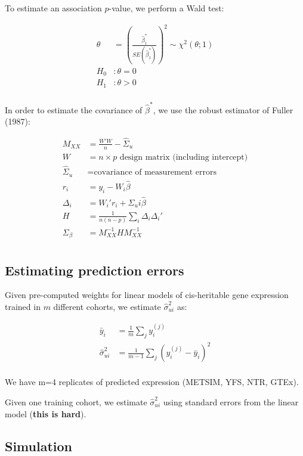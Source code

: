 \documentclass{article}
\begin{document}
To estimate an association \(p\)-value, we perform a Wald test:

\begin{align*}
  \theta &= \left(\frac{\hat\beta_1^*}{SE(\hat\beta_1^*)}\right)^2 \sim \chi^2(\theta; 1)\\
  H_0&: \theta = 0\\
  H_1&: \theta > 0\\
\end{align*}

In order to estimate the covariance of \(\hat\beta^*\), we use the robust
estimator of Fuller (1987):

\begin{align*}
  M_{XX} &= \frac{W' W}{n} - \hat\Sigma_u\\
  W &= \text{$n \times p$ design matrix (including intercept)}\\
  \hat\Sigma_u &= \text{covariance of measurement errors}\\
  r_i &= y_i - W_i \hat\beta\\
  \Delta_i &= W_i' r_i + \Sigma_ui \hat\beta\\
  H &= \frac{1}{n(n - p)} \sum_i \Delta_i \Delta_i'\\
  \Sigma_\beta &= M_{XX}^{-1} H M_{XX}^{-1}\\
\end{align*}

\subsection{Estimating prediction errors}

Given pre-computed weights for linear models of cis-heritable gene
expression trained in \(m\) different cohorts, we estimate \(\hat\sigma_{ui}^2\) as:

\begin{align*}
  \bar y_i &= \frac{1}{m} \sum_j y_i^{(j)}\\
  \hat\sigma_{ui}^2 &= \frac{1}{m - 1} \sum_j (y_i^{(j)} - \bar y_i)^2\\
\end{align*}

We have m=4 replicates of predicted expression (METSIM, YFS, NTR, GTEx).

Given one training cohort, we estimate \(\hat\sigma_{ui}^2\) using standard
errors from the linear model (\textbf{this is hard}).

\subsection{Simulation}
\end{document}
